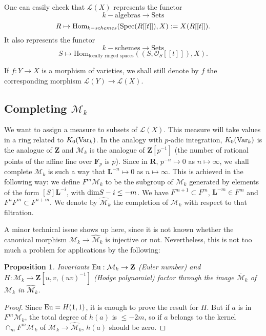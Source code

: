 \documentclass[english,12pt]{amsart}
\def\Spec{{\rm Spec}}
\def\FF{{\mathbf F}}
\def\LL{{\mathbf L}}
\def\RR{{\mathbf R}}
\def\ZZ{{\mathbf Z}}
\def\cL{{\mathcal L}}
\def\cM{{\mathcal M}}
\def\cO{{\mathcal O}}
\newtheorem{prop}[subsubsection]{Proposition}
\theoremstyle{definition}
\theoremstyle{remark}
\theoremstyle{plain}
\numberwithin{equation}{subsection}
\def\FF{{\mathbf F}}
\def\LL{{\mathbf L}}
\def\RR{{\mathbf R}}
\def\ZZ{{\mathbf Z}}
\def\cL{{\mathcal L}}
\def\cM{{\mathcal M}}
\def\cO{{\mathcal O}}
\begin{document}
One can easily check that $\cL (X)$ represents the functor
$$  k-\text{algebras} \longrightarrow \text{Sets}$$
$$ R \mapsto  \text{Hom}_{k-schemes}(\Spec(R[[t]]),X):=X(R[[t]]). $$
It also represents the functor
$$  k-\text{schemes} \longrightarrow \text{Sets}$$
$$S \mapsto  \text{Hom}_{\text{locally ringed spaces}}((S, \cO_S [[t]]),X). $$


If $f : Y \rightarrow X$ is a morphism of varieties, we shall still 
denote by 
$f$ the corresponding morphism $\cL (Y) \rightarrow \cL (X)$.


\subsection{Completing $\cM_k$}We want to assign a measure
to subsets of $\cL (X)$. This measure will take values
in a ring related to $K_0 ({\rm Var}_k)$. In the analogy with $p$-adic integration,
$K_0 ({\rm Var}_k)$ is the analogue of $\ZZ$
and $\cM_k$ is the analogue of $\ZZ[p^{-1}]$ (the number of rational
points of the affine line over $\FF_p$ is $p$). Since in $\RR$, $p^{-n} \mapsto 0$
as $n \mapsto \infty$, we shall complete
$\cM_k$ is such a way that
$\LL^{-n} \mapsto 0$
as $n \mapsto \infty$.
This is achieved in the following way: 
we define $F^m \cM_k$ to be the subgroup
of
$\cM_k$ generated by elements of the form
$[S] \LL^{-i}$, with ${\rm dim}S - i \leq -m$.
We have $F^{m + 1} \subset F^m$,
$\LL^{-m} \in F^m$ and $F^n F^m \subset F^{n + m}$.
We denote by $\widehat \cM_k$ the completion of
$\cM_k$ with respect to that filtration.


A minor technical issue shows up here, since it is not known whether
the canonical morphism
$\cM_k \rightarrow \widehat \cM_k$ is injective or not.
Nevertheless, this is not too much a problem for applications by the following:


\begin{prop}Invariants ${\rm Eu} : \cM_k \rightarrow \ZZ$ (Euler number)
and $H:  \cM_k \rightarrow \ZZ [u, v, (uv)^{-1}]$ (Hodge polynomial) factor through
the image $\overline \cM_k$ of
$\cM_k$ in $\widehat \cM_k$.
\end{prop}


\begin{proof}Since ${\rm Eu} = H (1, 1)$, it is enough to prove
the result for $H$. 
But if $a$ is in $F^m \cM_k$, the total degree of $h (a)$ is $\leq - 2m$, so if $a$
belongs to the kernel $\cap_m F^m \cM_k$
of  $\cM_k \rightarrow \widehat \cM_k$, $h (a)$ should be zero.
\end{proof}
\end{document}
